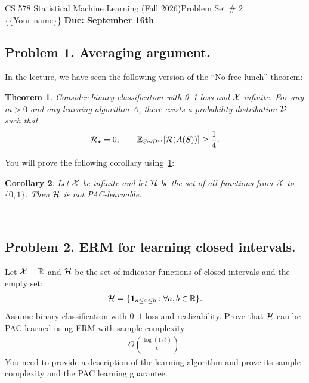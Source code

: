 \documentclass[12pt]{article}
\theoremstyle{plain}
\newtheorem{theorem}{Theorem}
\newtheorem{corollary}[theorem]{Corollary}
\theoremstyle{definition}
\begin{document}
\noindent CS 578 Statistical Machine Learning (Fall 2026)\hfill Problem Set \# 2\\
\{\{Your name\}\} \hfill \textbf{Due: September 16th}

\noindent\hrulefill

\subsection*{Problem 1. Averaging argument.}
In the lecture, we have seen the following version of the ``No free lunch'' theorem:
\begin{theorem}\label{thm:NFL}
Consider binary classification with 0–1 loss and ${\cal X}$ infinite. For any $m>0$ and any learning algorithm $A$, there exists a probability distribution ${\cal D}$ such that
\begin{align*}
    {\cal R}_\star=0,\qquad \mathbb{E}_{S\sim {\cal D}^m}[\mathcal{R}(A(S))]\geq \frac{1}{4}.
\end{align*}
\end{theorem}
You will prove the following corollary using~\cref{thm:NFL}: 
\begin{corollary}
Let ${\cal X}$ be infinite and let ${\cal H}$ be the set of all functions from ${\cal X}$ to $\{0,1\}$. Then ${\cal H}$ is not PAC-learnable.
\end{corollary}
\newline 
\   %
\newpage

\subsection*{Problem 2. ERM for learning closed intervals.}
Let ${\cal X}=\mathbb{R}$ and ${\cal H}$ be the set of indicator functions of closed intervals and the empty set:
\begin{align*}
    {\cal H}=\{\mathbf{1}_{a\leq x\leq b}:\forall a,b\in \mathbb{R}\}.
\end{align*}
Assume binary classification with $0$--$1$ loss and realizability. Prove that ${\cal H}$ can be PAC-learned using ERM with sample complexity
\begin{align*}
    O\left(\frac{\log (1/\delta)}{\epsilon}\right).
\end{align*}
You need to provide a description of the learning algorithm and prove its sample complexity and the PAC learning guarantee.

\newline 
\   %
\newpage
\end{document}
